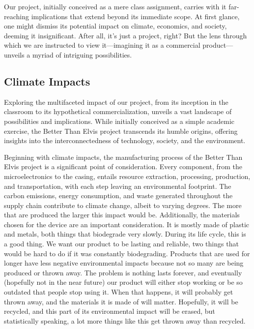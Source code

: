 Our project, initially conceived as a mere class assignment, carries with it far-reaching implications that extend beyond its immediate scope. At first glance, one might dismiss its potential impact on climate, economics, and society, deeming it insignificant. After all, it's just a project, right? But the lens through which we are instructed to view it—imagining it as a commercial product—unveils a myriad of intriguing possibilities.

\subsection{Climate Impacts}

Exploring the multifaceted impact of our project, from its inception in the classroom to its hypothetical commercialization, unveils a vast landscape of possibilities and implications. While initially conceived as a simple academic exercise, the Better Than Elvis project transcends its humble origins, offering insights into the interconnectedness of technology, society, and the environment.

Beginning with climate impacts, the manufacturing process of the Better Than Elvis project is a significant point of consideration. Every component, from the microelectronics to the casing, entails resource extraction, processing, production, and transportation, with each step leaving an environmental footprint. The carbon emissions, energy consumption, and waste generated throughout the supply chain contribute to climate change, albeit to varying degrees. The more that are produced the larger this impact would be. Additionally, the materials chosen for the device are an important consideration. It is mostly made of plastic and metals, both things that biodegrade very slowly. During its life cycle, this is a good thing. We want our product to be lasting and reliable, two things that would be hard to do if it was constantly biodegrading. Products that are used for longer have less negative environmental impacts because not so many are being produced or thrown away. The problem is nothing lasts forever, and eventually (hopefully not in the near future) our product will either stop working or be so outdated that people stop using it. When that happens, it will probably get thrown away, and the materials it is made of will matter. Hopefully, it will be recycled, and this part of its environmental impact will be erased, but statistically speaking, a lot more things like this get thrown away than recycled.

